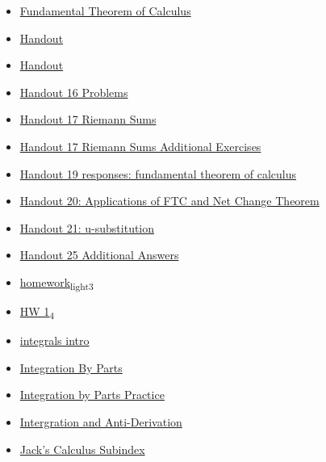\documentclass[11pt]{article}
\begin{document}
\begin{itemize}
\begin{itemize}
\begin{itemize}
\item \href{mathematics/single\_variable\_calculus/KBrefFundamentalTheoremOfCalculus.org}{Fundamental Theorem of Calculus}
\item \href{mathematics/single\_variable\_calculus/KBdHandout4p2.org}{Handout}
\item \href{mathematics/single\_variable\_calculus/KBdHandout4p1.org}{Handout}
\item \href{mathematics/single\_variable\_calculus/KBe21math401retHandout16TaylorSeries.org}{Handout 16 Problems}
\item \href{mathematics/single\_variable\_calculus/KBe21math401retHandout17RiemannSums.org}{Handout 17 Riemann Sums}
\item \href{mathematics/single\_variable\_calculus/KBe21math401retHandout17AdditionalExercises.org}{Handout 17 Riemann Sums Additional Exercises}
\item \href{mathematics/single\_variable\_calculus/KBe21math401retHandout19FundamentalTheoremCalculus.org}{Handout 19 responses: fundamental theorem of calculus}
\item \href{mathematics/single\_variable\_calculus/KBe21math401retHandout20.org}{Handout 20: Applications of FTC and Net Change Theorem}
\item \href{mathematics/single\_variable\_calculus/KBe21math401retHandout21uSubstitution.org}{Handout 21: u-substitution}
\item \href{mathematics/single\_variable\_calculus/KBe21math401retHandout25AreaBetweenCurves.org}{Handout 25 Additional Answers}
\item \href{mathematics/single\_variable\_calculus/KB20200916215836.org}{homework\textsubscript{light}\textsubscript{3}}
\item \href{mathematics/single\_variable\_calculus/KBe20math401ret1\_4.org}{HW 1\textsubscript{4}}
\item \href{mathematics/single\_variable\_calculus/KBe21math401floIntegrals.org}{integrals intro}
\item \href{mathematics/single\_variable\_calculus/KBe21math401retHandout23IntegrationByParts.org}{Integration By Parts}
\item \href{mathematics/single\_variable\_calculus/KBe21math401floIntegrationByPartsPractice.org}{Integration by Parts Practice}
\item \href{mathematics/single\_variable\_calculus/KBhMATH401Intergrals.org}{Intergration and Anti-Derivation}
\item \href{mathematics/single\_variable\_calculus/KBhMATH401SubIndex.org}{Jack's Calculus Subindex}

\end{itemize}
\end{itemize}
\end{itemize}
\end{document}
